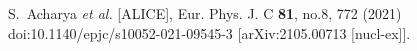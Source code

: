 S.~Acharya \textit{et al.} [ALICE],
Eur. Phys. J. C \textbf{81}, no.8, 772 (2021)
doi:10.1140/epjc/s10052-021-09545-3
[arXiv:2105.00713 [nucl-ex]].
